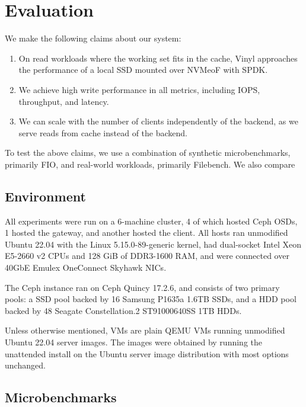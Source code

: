 \section{Evaluation} \label{sec:evaluation}

We make the following claims about our system:

\begin{enumerate}

	\item On read workloads where the working set fits in the cache, Vinyl
	      approaches the performance of a local SSD mounted over NVMeoF with SPDK.

	\item We achieve high write performance in all metrics, including IOPS,
	      throughput, and latency.

	\item We can scale with the number of clients independently of the backend,
	      as we serve reads from cache instead of the backend.

\end{enumerate}

To test the above claims, we use a combination of synthetic microbenchmarks,
primarily FIO, and real-world workloads, primarily Filebench. We also compare

\subsection{Environment}

All experiments were run on a 6-machine cluster, 4 of which hosted Ceph OSDs, 1
hosted the gateway, and another hosted the client. All hosts ran unmodified
Ubuntu 22.04 with the Linux 5.15.0-89-generic kernel, had dual-socket Intel Xeon
E5-2660 v2 CPUs and 128 GiB of DDR3-1600 RAM, and were connected over 40GbE
Emulex OneConnect Skyhawk NICs.

The Ceph instance ran on Ceph Quincy 17.2.6, and consists of two primary pools:
a SSD pool backed by 16 Samsung P1635a 1.6TB SSDs, and a HDD pool backed by 48
Seagate Constellation.2 ST91000640SS 1TB HDDs.

Unless otherwise mentioned, VMs are plain QEMU VMs running unmodified Ubuntu
22.04 server images. The images were obtained by running the unattended install
on the Ubuntu server image distribution with most options unchanged.

\subsection{Microbenchmarks}

